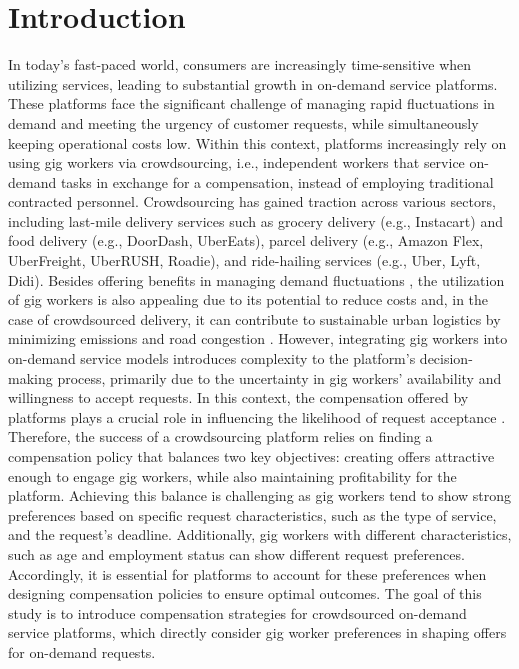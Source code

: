 \section{Introduction}

\noindent In today's fast-paced world, consumers are increasingly time-sensitive when utilizing services, leading to substantial growth in on-demand service platforms. These platforms face the significant challenge of managing rapid fluctuations in demand and meeting the urgency of customer requests, while simultaneously keeping operational costs low. Within this context, platforms increasingly rely on using gig workers via crowdsourcing, i.e., independent workers that service on-demand tasks in exchange for a compensation, instead of employing traditional contracted personnel. Crowdsourcing has gained traction across various sectors, including last-mile delivery services such as grocery delivery (e.g., Instacart) and food delivery (e.g., DoorDash, UberEats), parcel delivery (e.g., Amazon Flex, UberFreight, UberRUSH, Roadie), and ride-hailing services (e.g., Uber, Lyft, Didi). Besides offering benefits in managing demand fluctuations \citep{luy2023strategic}, the utilization of gig workers is also appealing due to its potential to reduce costs \citep{fatehi2022crowdsourcing} and, in the case of crowdsourced delivery, it can contribute to sustainable urban logistics by minimizing emissions and road congestion \citep{yuen2023sustainable}. However, integrating gig workers into on-demand service models introduces complexity to the platform’s decision-making process, primarily due to the uncertainty in gig workers' availability and willingness to accept requests. In this context, the compensation offered by platforms plays a crucial role in influencing the likelihood of request acceptance \citep{barbosa2023data, bathke2023occasional}. Therefore, the success of a crowdsourcing platform relies on finding a compensation policy that balances two key objectives: creating offers attractive enough to engage gig workers, while also maintaining profitability for the platform. Achieving this balance is challenging as gig workers tend to show strong preferences based on specific request characteristics, such as the type of service, and the request's deadline. Additionally, gig workers with different characteristics, such as age and employment status can show different request preferences. Accordingly, it is essential for platforms to account for these preferences when designing compensation policies to ensure optimal outcomes. The goal of this study is to introduce compensation strategies for crowdsourced on-demand service platforms, which directly consider gig worker preferences in shaping offers for on-demand requests. 

